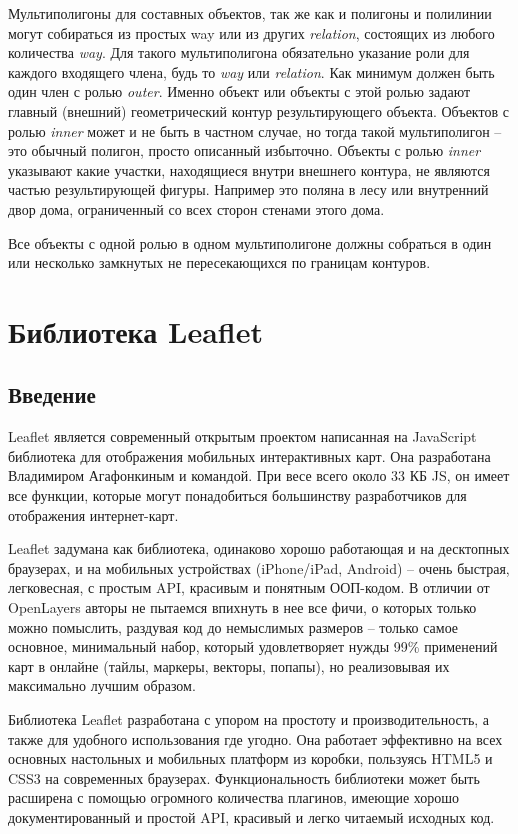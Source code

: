 Мультиполигоны для составных объектов, так же как и полигоны и полилинии могут 
собираться из простых way или из других \emph{relation}, состоящих из любого 
количества \emph{way}. Для такого мультиполигона обязательно указание роли для 
каждого входящего члена, будь то \emph{way} или \emph{relation}. Как минимум 
должен быть один член с ролью \emph{outer}. Именно объект или объекты с этой 
ролью задают главный (внешний) геометрический контур результирующего объекта. 
Объектов с ролью \emph{inner} может и не быть в частном случае, но тогда такой 
мультиполигон -- это обычный полигон, просто описанный избыточно. Объекты с 
ролью \emph{inner} указывают какие участки, находящиеся внутри внешнего 
контура, не являются частью результирующей фигуры. Например это поляна в лесу 
или внутренний двор дома, ограниченный со всех сторон стенами этого дома.

Все объекты с одной ролью в одном мультиполигоне должны собраться в один или 
несколько замкнутых не пересекающихся по границам контуров.\cite{habrahabr01}

\section{Библиотека Leaflet}
\subsection{Введение}

Leaflet является современный открытым проектом написанная на JavaScript 
библиотека для отображения мобильных интерактивных карт. Она разработана 
Владимиром Агафонкиным и командой. При весе всего около 33 КБ JS, он имеет все 
функции, которые могут понадобиться большинству разработчиков для отображения 
интернет-карт.

Leaflet задумана как библиотека, одинаково хорошо работающая и на десктопных 
браузерах, и на мобильных устройствах (iPhone/iPad, Android) -- очень быстрая, 
легковесная, с простым API, красивым и понятным ООП-кодом. В отличии от 
OpenLayers\cite{openlayers} авторы не пытаемся впихнуть в нее все фичи, о 
которых только можно помыслить, раздувая код до немыслимых размеров -- 
только самое основное, минимальный набор, который удовлетворяет нужды 99\% 
применений карт в онлайне (тайлы, маркеры, векторы, попапы), но 
реализовывая их максимально лучшим образом.

Библиотека Leaflet разработана с упором на простоту и производительность, а 
также для удобного использования где угодно. Она работает эффективно на всех 
основных настольных и мобильных платформ из коробки, пользуясь HTML5 и CSS3 
на современных браузерах. Функциональность библиотеки может быть расширена 
с помощью огромного количества плагинов, имеющие хорошо документированный и 
простой API, красивый и легко читаемый исходных код.\cite{leaflet}

